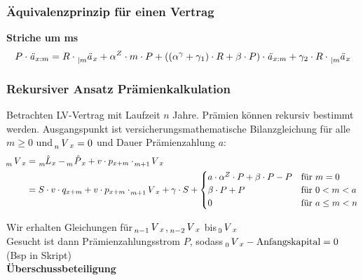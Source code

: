 \documentclass[12pt]{report}
\theoremstyle{dotless}
\theoremstyle{definition}
\begin{document}
\subsubsection{Äquivalenzprinzip für einen Vertrag}
\textbf{Striche um ms}
\begin{equation}
P \cdot \text{\textit{ä}}_{x:m} = R \cdot \tensor[_{|m}]{\text{\textit{ä}}}{}_x + \alpha^Z \cdot m \cdot P + ((\alpha^\gamma + \gamma_1)\cdot R + \beta \cdot P) \cdot \text{\textit{ä}}_{x:m} + \gamma_2 \cdot R \cdot \tensor[_{|m}]{\text{\textit{ä}}}{}_x
\end{equation}

\subsubsection{Rekursiver Ansatz Prämienkalkulation}
Betrachten LV-Vertrag mit Laufzeit $n$ Jahre. Prämien können rekursiv bestimmt werden. Ausgangspunkt ist versicherungsmathematische Bilanzgleichung für alle $m\geq 0$ und $\tensor[_n]{V}{}_x=0$ und Dauer Prämienzahlung $a$:
\begin{equation}
\begin{aligned}
\tensor[_m]{V}{}_x & = \tensor[_m]{\hat{L}}{}_x - \tensor[_m]{\hat{P}}{}_x + v \cdot p_{x+m} \cdot \tensor[_{m+1}]{V}{}_x \\
& =S \cdot v \cdot q_{x+m} + v\cdot p_{x+m} \cdot \tensor[_{m+1}]{V}{}_x + \gamma \cdot S + \begin{cases}
	a \cdot \alpha^Z \cdot P + \beta \cdot P - P & \text{für } m=0 \\
	\beta \cdot P + P & \text{für } 0<m< a \\
	0 & \text{für } a\leq m < n
	\end{cases}
\end{aligned}
\end{equation}

Wir erhalten Gleichungen für $\tensor[_{n-1}]{V}{}_x$, $\tensor[_{n-2}]{V}{}_x$ bis $ \tensor[_0]{V}{}_x$ \\
Gesucht ist dann Prämienzahlungsstrom $P$, sodass $\tensor[_0]{V}{}_x - \text{Anfangskapital} =0$ (Bsp in Skript)\\

\large \textbf{Überschussbeteiligung}
\normalsize 
\end{document}
